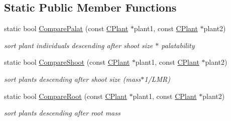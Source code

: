 \subsection*{Static Public Member Functions}
\begin{DoxyCompactItemize}
\item 
\mbox{\label{class_c_plant_a2620b453aa5e8f60eff16a0d879c192a}} 
static bool \mbox{\hyperlink{class_c_plant_a2620b453aa5e8f60eff16a0d879c192a}{Compare\+Palat}} (const \mbox{\hyperlink{class_c_plant}{C\+Plant}} $\ast$plant1, const \mbox{\hyperlink{class_c_plant}{C\+Plant}} $\ast$plant2)
\begin{DoxyCompactList}\small\item\em sort plant individuals descending after shoot size $\ast$ palatability \end{DoxyCompactList}\item 
\mbox{\label{class_c_plant_a2bbc402aa0bb50fcace262cb1bcf8136}} 
static bool \mbox{\hyperlink{class_c_plant_a2bbc402aa0bb50fcace262cb1bcf8136}{Compare\+Shoot}} (const \mbox{\hyperlink{class_c_plant}{C\+Plant}} $\ast$plant1, const \mbox{\hyperlink{class_c_plant}{C\+Plant}} $\ast$plant2)
\begin{DoxyCompactList}\small\item\em sort plants descending after shoot size (mass$\ast$1/\+L\+MR) \end{DoxyCompactList}\item 
\mbox{\label{class_c_plant_a1cdae9aa7ef08c0f0fc70fc7de765e82}} 
static bool \mbox{\hyperlink{class_c_plant_a1cdae9aa7ef08c0f0fc70fc7de765e82}{Compare\+Root}} (const \mbox{\hyperlink{class_c_plant}{C\+Plant}} $\ast$plant1, const \mbox{\hyperlink{class_c_plant}{C\+Plant}} $\ast$plant2)
\begin{DoxyCompactList}\small\item\em sort plants descending after root mass \end{DoxyCompactList}\end{DoxyCompactItemize}
